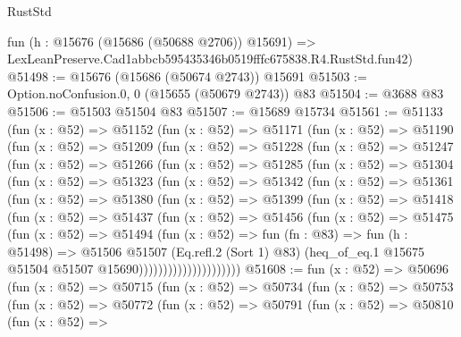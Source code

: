 \begin{lexlean}{RustStd}
\begin{coremodule}
    fun (h : @15676 (@15686 (@50688 @2706)) @15691) =>
    LexLeanPreserve.Cad1abbcb595435346b0519fffc675838.R4.RustStd.fun42)
@51498 := @15676 (@15686 (@50674 @2743)) @15691
@51503 := Option.noConfusion.{0, 0} (@15655 (@50679 @2743)) @83
@51504 := @3688 @83
@51506 := @51503 @51504 @83
@51507 := @15689 @15734
@51561 := @51133
    (fun (x : @52) =>
    @51152
      (fun (x : @52) =>
      @51171
        (fun (x : @52) =>
        @51190
          (fun (x : @52) =>
          @51209
            (fun (x : @52) =>
            @51228
              (fun (x : @52) =>
              @51247
                (fun (x : @52) =>
                @51266
                  (fun (x : @52) =>
                  @51285
                    (fun (x : @52) =>
                    @51304
                      (fun (x : @52) =>
                      @51323
                        (fun (x : @52) =>
                        @51342
                          (fun (x : @52) =>
                          @51361
                            (fun (x : @52) =>
                            @51380
                              (fun (x : @52) =>
                              @51399
                                (fun (x : @52) =>
                                @51418
                                  (fun (x : @52) =>
                                  @51437
                                    (fun (x : @52) =>
                                    @51456
                                      (fun (x : @52) =>
                                      @51475
                                        (fun (x : @52) =>
                                        @51494
                                          (fun (x : @52) =>
                                          fun (fn : @83) =>
                                          fun (h : @51498) =>
                                          @51506
                                            @51507
                                            (Eq.refl.{2} (Sort 1) @83)
                                            (heq_of_eq.{1}
                                              @15675
                                              @51504
                                              @51507
                                              @15690)))))))))))))))))))))
@51608 := fun (x : @52) =>
  @50696
    (fun (x : @52) =>
    @50715
      (fun (x : @52) =>
      @50734
        (fun (x : @52) =>
        @50753
          (fun (x : @52) =>
          @50772
            (fun (x : @52) =>
            @50791
              (fun (x : @52) =>
              @50810
                (fun (x : @52) =>

\end{coremodule}
\end{lexlean}
